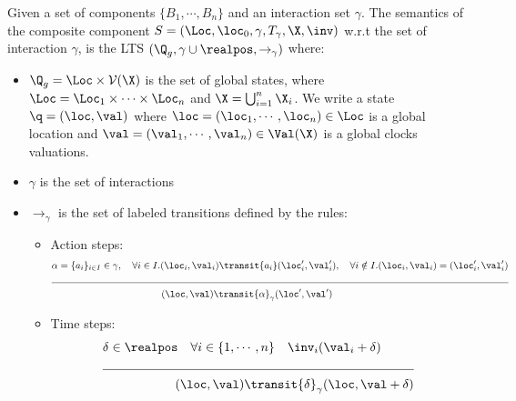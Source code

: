\begin{property}
Given a set of components $\{B_1,\cdots,B_n\}$ and an interaction set $\gamma$.
The semantics of the composite component $S = (\Loc,\loc_0,\gamma,T_{\gamma},\X,\inv)$ w.r.t the set of interaction 
$\gamma$, is the LTS $(\Q_g,\gamma\cup\realpos,\to_{\gamma})$ where:
\begin{itemize}
  \item $\Q_g=\Loc\times\mathcal{V}(\X)$ is the set of global states, where $\Loc=\Loc_1\times
  \cdots\times\Loc_n$ and $\X=\bigcup^n_{i=1}\X_i$. We write a state $\q=(\loc,\val)$
  where $\loc=(\loc_1,\cdots,\loc_n)\in\Loc$ is a global location and $\val=(\val_1,
  \cdots,\val_n)\in\Val(\X)$ is a global clocks valuations.
  \item $\gamma$ is the set of interactions
  \item $\to_{\gamma}$ is the set of labeled transitions defined by the rules: 
  \begin{itemize}
    \item Action steps:
          \begin{align*}
            &\alpha=\{a_i\}_{i\in I}\in\gamma, \quad \forall i\in I.(\loc_i,\val_i)
            \transit{a_i}(\loc_i',\val_i'),\quad \forall i \notin I.(\loc_i,\val_i)
          =(\loc_i',\val'_i) \\ 
          \cline{1-2}
          &\hspace{4cm}(\loc,\val)\transit{\alpha}_{\gamma}(\loc',\val')\\
          \end{align*}
        \item Time steps:
          \begin{align*}
            &\delta\in\realpos \quad\forall i\in\{1,\cdots,n\}\quad \inv_i(\val_i+\delta)
            \\
                \cline{1-2}
                &\hspace{2cm}(\loc,\val)\transit{\delta}_{\gamma}(\loc,
                \val+\delta)\\
          \end{align*}
      \end{itemize}
  \end{itemize}
\end{property}

